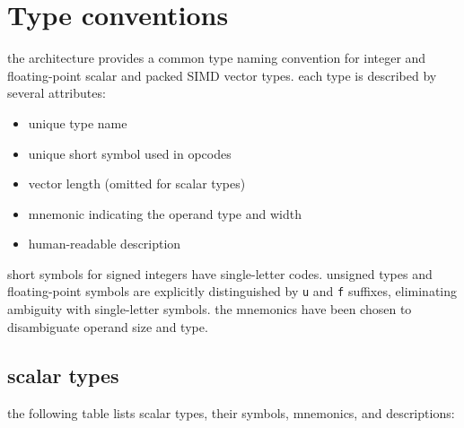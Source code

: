 \newpage
\section{Type conventions}

the architecture provides a common type naming convention for
integer and floating-point scalar and packed SIMD vector types.
each type is described by several attributes:

\vspace{-0.3em}

\begin{itemize}[itemsep=0pt]
\item unique type name
\item unique short symbol used in opcodes
\item vector length (omitted for scalar types)
\item mnemonic indicating the operand type and width
\item human-readable description
\end{itemize}

\par\noindent
short symbols for signed integers have single-letter codes. unsigned types
and floating-point symbols are explicitly distinguished by \texttt{u} and
\texttt{f} suffixes, eliminating ambiguity with single-letter symbols.
the mnemonics have been chosen to disambiguate operand size and type.

\subsection{scalar types}

the following table lists scalar types, their symbols, mnemonics, and descriptions:

